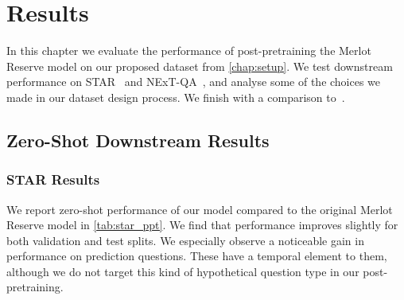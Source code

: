\chapter{Results}
\label{chap:results}

In this chapter we evaluate the performance of post-pretraining the Merlot
Reserve model on our proposed dataset from \cref{chap:setup}. We test
downstream performance on STAR~\citep{wu2021star} and
NExT-QA~\citep{xiao2021nextqa}, and analyse some of the choices we made in our
dataset design process. We finish with a comparison
to~\citep{bagad2023testoftime}.

\section{Zero-Shot Downstream Results}
\label{sec:zs_results}

\subsection{STAR Results}
\label{ssec:star_results}

We report zero-shot performance of our model compared to the original Merlot Reserve
model in \cref{tab:star_ppt}. We find that performance improves slightly for both
validation and test splits. We especially observe a noticeable gain in performance
on prediction questions. These have a temporal element to them, although we do not
target this kind of hypothetical question type in our post-pretraining.

